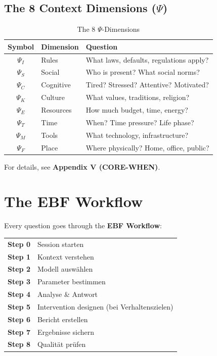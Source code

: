 \subsection{The 8 Context Dimensions ($\Psi$)}

\begin{table}[htbp]
\centering
\caption{The 8 $\Psi$-Dimensions}
\label{tab:psi-dimensions}
\renewcommand{\arraystretch}{1.3}
\begin{tabular}{@{}cll@{}}
\toprule
\textbf{Symbol} & \textbf{Dimension} & \textbf{Question} \\
\midrule
$\Psi_I$ & Rules & What laws, defaults, regulations apply? \\
$\Psi_S$ & Social & Who is present? What social norms? \\
$\Psi_C$ & Cognitive & Tired? Stressed? Attentive? Motivated? \\
$\Psi_K$ & Culture & What values, traditions, religion? \\
$\Psi_E$ & Resources & How much budget, time, energy? \\
$\Psi_T$ & Time & When? Time pressure? Life phase? \\
$\Psi_M$ & Tools & What technology, infrastructure? \\
$\Psi_F$ & Place & Where physically? Home, office, public? \\
\bottomrule
\end{tabular}
\end{table}

For details, see \textbf{Appendix V (CORE-WHEN)}.


\section{The EBF Workflow}
\label{sec:ref-ebf-workflow}

Every question goes through the \textbf{EBF Workflow}:

\begin{tcolorbox}[colback=gray!5!white, colframe=gray!75!black,
    title=The EBF Workflow: 8 Steps]

\begin{tabular}{@{}rl@{}}
\textbf{Step 0} & Session starten \\
\textbf{Step 1} & Kontext verstehen \\
\textbf{Step 2} & Modell auswählen \\
\textbf{Step 3} & Parameter bestimmen \\
\textbf{Step 4} & Analyse \& Antwort \\
\textbf{Step 5} & Intervention designen (bei Verhaltenszielen) \\
\textbf{Step 6} & Bericht erstellen \\
\textbf{Step 7} & Ergebnisse sichern \\
\textbf{Step 8} & Qualität prüfen \\
\end{tabular}

\end{tcolorbox}

